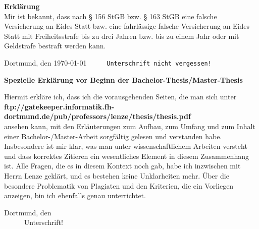 \documentclass[12pt,twoside]{report}   %
\begin{document}
\vspace*{3cm}
\noindent
{\bf Erklärung} \\
Mir ist bekannt, dass nach § 156 StGB bzw. § 163 StGB eine falsche
Versicherung an Eides Statt bzw. eine fahrlässige falsche Versicherung an
Eides Statt mit Freiheitsstrafe bis zu drei Jahren bzw. bis zu einem Jahr oder
mit Geldstrafe bestraft werden kann. 

\vspace{1cm}
Dortmund, den \today
\ \ \  \ \ \hfill {\tt Unterschrift nicht vergessen!} \\


\newpage
\thispagestyle{empty}
\noindent
\vspace*{6cm}
\begin{center}
{\bf Spezielle Erklärung vor Beginn der Bachelor-Thesis/Master-Thesis}
\end{center}
Hiermit erkläre ich, dass ich die vorausgehenden Seiten, die man sich unter 
\\[0.2cm]
{\scriptsize \bf \hspace*{0.3cm}ftp://gatekeeper.informatik.fh-dortmund.de/pub/professors/lenze/thesis/thesis.pdf} \\[0.2cm]
ansehen kann, mit den Erläuterungen zum Aufbau, zum Umfang und zum Inhalt einer
Bachelor-/Master-Arbeit sorgfältig 
gelesen und verstanden habe. Insbesondere ist mir klar, was man unter
wissenschaftlichem Arbeiten versteht und dass korrektes Zitieren ein
wesentliches Element in diesem Zusammenhang ist. Alle Fragen, die es in diesem
Kontext noch gab, habe ich inzwischen mit Herrn Lenze geklärt, und es bestehen
keine Unklarheiten mehr. Über die besondere Problematik von Plagiaten und den
Kriterien, die ein Vorliegen anzeigen, bin ich ebenfalls genau unterrichtet.

\vspace{1.5cm}
Dortmund, den \\
\ \ \  \ \ \hspace*{8cm} {\tiny Unterschrift!} \\

\vfill
\end{document}
